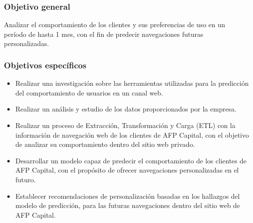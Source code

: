 \subsubsection{Objetivo general}
Analizar el comportamiento de los clientes y sus preferencias de uso en un período de hasta 1 mes, con el fin de predecir navegaciones futuras personalizadas.

\subsubsection{Objetivos específicos}
\begin{itemize}
\item Realizar una investigación sobre las herramientas utilizadas para la predicción del comportamiento de usuarios en un canal web.
\item Realizar un análisis y estudio de los datos proporcionados por la empresa.
\item Realizar un proceso de Extracción, Transformación y Carga (ETL) con la información de navegación web de los clientes de AFP Capital, con el objetivo de analizar su comportamiento dentro del sitio web privado.
\item Desarrollar un modelo capaz de predecir el comportamiento de los clientes de AFP Capital, con el propósito de ofrecer navegaciones personalizadas en el futuro.
\item Establecer recomendaciones de personalización basadas en los hallazgos del modelo de predicción, para las futuras navegaciones dentro del sitio web de AFP Capital.
\end{itemize}